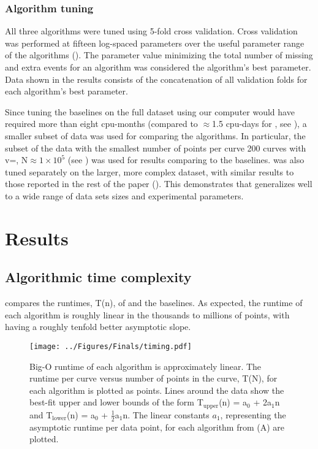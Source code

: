 \subsection{Algorithm tuning}

All three algorithms were tuned using 5-fold cross validation. Cross validation was performed at fifteen log-spaced parameters over the useful parameter range of the algorithms (). The parameter value minimizing the total number of missing and extra events for an algorithm was considered the algorithm's best parameter. Data shown in the results consists of the concatenation of all validation folds for each algorithm's best parameter. 

Since tuning the baselines on the full dataset using our computer would have required more than eight cpu-months (compared to $\approx$1.5 cpu-days for \name{}, see ), a smaller subset of data was used for comparing the algorithms. In particular, the subset of the data with the smallest number of points per curve \textemdash{} 200 curves with v=, N$\approx1\times10^{5}$ (see ) \textemdash{} was used for results comparing \name{} to the baselines. \name{} was also tuned separately on the larger, more complex dataset, with similar results to those reported in the rest of the paper (). This demonstrates that \name{} generalizes well to a wide range of data sets sizes and experimental parameters.

\chapter{Results}

\section{Algorithmic time complexity}

 compares the runtimes, T(n), of \name{} and the baselines. As expected, the runtime of each algorithm is roughly linear in the thousands to millions of points, with \name{} having a roughly tenfold better asymptotic slope.  

\begin{figure}[htpb]
\caption[Runtime versus length of curve]{\noindent{} Big-O runtime of each algorithm is approximately linear.  The runtime per curve versus number of points in the curve, T(N), for each algorithm is plotted as points. Lines around the data show the best-fit upper and lower bounds of the form T$_{\mathrm{upper}}$(n) = a$_0$ + 2a$_1$n  and T$_{\mathrm{lower}}$(n) = a$_0$ + $\frac{1}{2}$a$_1$n.  The linear constants $a_1$, representing the asymptotic runtime per data point, for each algorithm from (A) are plotted. }
\centering
\texttt{[image: ../Figures/Finals/timing.pdf]}%
\end{figure}

